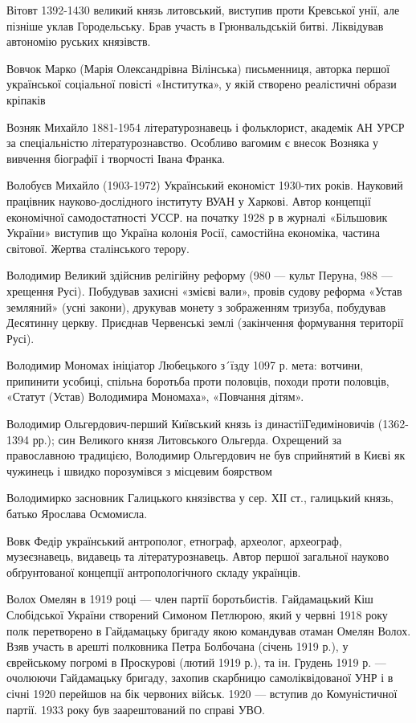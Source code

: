 Вітовт 1392-1430 великий князь литовський, виступив проти Кревської унії, але пізніше уклав Городельську. Брав участь в Грюнвальдській битві. Ліквідував автономію руських князівств.

Вовчок Марко (Марія Олександрівна Вілінська) письменниця, авторка першої української соціальної повісті «Інститутка», у якій створено реалістичні образи кріпаків

Возняк Михайло 1881-1954 літературознавець і фольклорист, академік АН УРСР за спеціальністю літературознавство. Особливо вагомим є внесок Возняка у вивчення біографії і творчості Івана Франка.   

Волобуєв Михайло (1903-1972) Український економіст 1930-тих років. Науковий працівник науково-дослідного інституту ВУАН у Харкові. Автор концепції економічної самодостатності УССР. на початку 1928 р в журналі «Більшовик України» виступив що Україна колонія Росії, самостійна економіка, частина світової. Жертва сталінського терору.

Володимир Великий здійснив релігійну реформу (980 --- культ Перуна, 988 --- хрещення Русі). Побудував захисні «змієві вали», провів судову реформа «Устав земляний» (усні закони), друкував монету з зображенням тризуба, побудував Десятинну церкву. Приєднав Червенські землі (закінчення формування території Русі).

Володимир Мономах ініціатор Любецького з´їзду 1097 р. мета: вотчини, припинити усобиці, спільна боротьба проти половців, походи проти половців, «Статут (Устав) Володимира Мономаха», «Повчання дітям».

Володимир Ольгердович-перший Київський князь із династіїГедиміновичів (1362-1394 рр.); син Великого князя Литовського Ольгерда. Охрещений за православною традицією, Володимир Ольгердович не був сприйнятий в Києві як чужинець і швидко порозумівся з місцевим боярством

Володимирко засновник Галицького князівства у сер. ХІІ ст., галицький князь, батько Ярослава Осмомисла.

Вовк Федір український антрополог, етнограф, археолог, археограф, музеєзнавець, видавець та літературознавець. Автор першої загальної науково обґрунтованої концепції антропологічного складу українців.

Волох Омелян в 1919 році --- член партії боротьбистів. Гайдамацький Кіш Слобідської України створений Симоном Петлюрою, який у червні 1918 року полк перетворено в Гайдамацьку бригаду якою командував отаман Омелян Волох. Взяв участь в арешті полковника Петра Болбочана (січень 1919 р.), у єврейському погромі в Проскурові (лютий 1919 р.), та ін. Грудень 1919 р. --- очолюючи Гайдамацьку бригаду, захопив скарбницю самоліквідованої УНР і в січні 1920 перейшов на бік червоних військ. 1920 --- вступив до Комуністичної партії. 1933 року був заарештований по справі УВО. 


